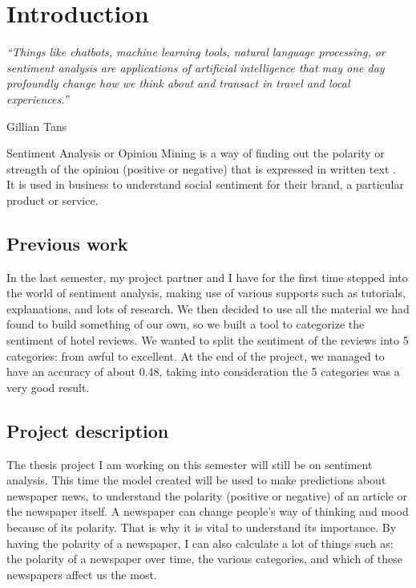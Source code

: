 \section[Introduction]{Introduction}
\label{chap:introduction}
\epigraph{\centering \textit{“Things like chatbots, machine learning tools, natural language processing, or sentiment analysis are applications of artificial intelligence that may one day profoundly change how we think about and transact in travel and local experiences.”}}{Gillian Tans}

Sentiment Analysis or Opinion Mining is a way of finding out the polarity or strength of the opinion (positive or negative) that is expressed in written text \cite{samuels_news_2020}.\\
It is used in business to understand social sentiment for their brand, a particular product or service.

\subsection[Previous work]{Previous work}
\label{chap:previouswork}
In the last semester, my project partner and I have for the first time stepped into the world of sentiment analysis, making use of various supports such as tutorials, explanations, and lots of research.
We then decided to use all the material we had found to build something of our own, so we built a tool to categorize the sentiment of hotel reviews.
We wanted to split the sentiment of the reviews into 5 categories: from awful to excellent.
At the end of the project, we managed to have an accuracy of about 0.48, taking into consideration the 5 categories was a very good result.


\subsection[Project description]{Project description}
\label{chap:intropj_desc}
The thesis project I am working on this semester will still be on sentiment analysis. This time the model created will be used to make predictions about newspaper news, to understand the polarity (positive or negative) of an article or the newspaper itself.
A newspaper can change people's way of thinking and mood because of its polarity. That is why it is vital to understand its importance.
By having the polarity of a newspaper, I can also calculate a lot of things such as: the polarity of a newspaper over time, the various categories, and which of these newspapers affect us the most.

